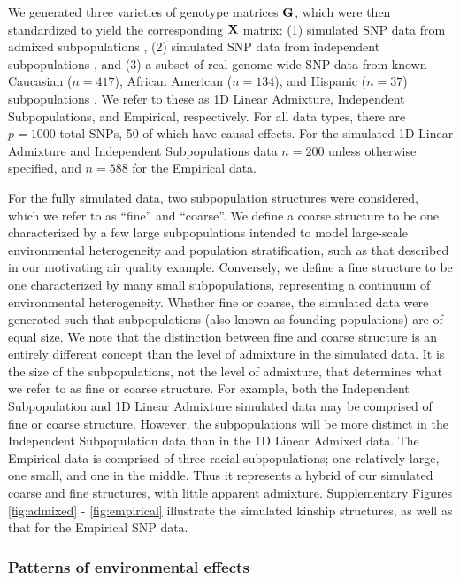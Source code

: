We generated three varieties of genotype matrices $\mathbf{G}$, which were then standardized to yield the corresponding $\mathbf{X}$ matrix: (1) simulated SNP data from admixed subpopulations \citep{Ochoa2016}, (2) simulated SNP data from independent subpopulations \citep{Ochoa2016}, and (3) a subset of real genome-wide SNP data from known Caucasian ($n = 417$), African American ($n = 134$), and Hispanic ($n = 37$) subpopulations \citep{larkin2015objectives}. We refer to these as 1D Linear Admixture, Independent Subpopulations, and Empirical, respectively. For all data types, there are $p = 1000$ total SNPs, 50 of which have causal effects. For the simulated 1D Linear Admixture and Independent Subpopulations data $n = 200$ unless otherwise specified, and $n = 588$ for the Empirical data. 

For the fully simulated data, two subpopulation structures were considered, which we refer to as ``fine'' and ``coarse''.  We define a coarse structure to be one characterized by a few large subpopulations intended to model large-scale environmental heterogeneity and population stratification, such as that described in our motivating air quality example. Conversely, we define a fine structure to be one characterized by many small subpopulations, representing a continuum of environmental heterogeneity. Whether fine or coarse, the simulated data were generated such that subpopulations (also known as founding populations) are of equal size. We note that the distinction between fine and coarse structure is an entirely different concept than the level of admixture in the simulated data. It is the size of the subpopulations, not the level of admixture, that determines what we refer to as fine or coarse structure. For example, both the Independent Subpopulation and 1D Linear Admixture simulated data may be comprised of fine or coarse structure. However, the subpopulations will be more distinct in the Independent Subpopulation data than in the 1D Linear Admixed data. The Empirical data is comprised of three racial subpopulations; one relatively large, one small, and one in the middle. Thus it represents a hybrid of our simulated coarse and fine structures, with little apparent admixture. Supplementary Figures \ref{fig:admixed} - \ref{fig:empirical} illustrate the simulated kinship structures, as well as that for the Empirical SNP data. 

\subsubsection{Patterns of environmental effects}

